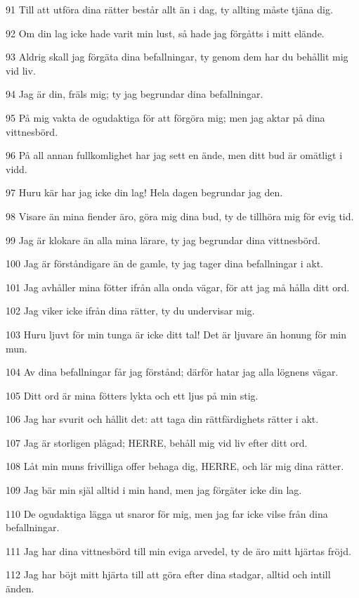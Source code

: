 \par 91 Till att utföra dina rätter består allt än i dag, ty allting måste tjäna dig.
\par 92 Om din lag icke hade varit min lust, så hade jag förgåtts i mitt elände.
\par 93 Aldrig skall jag förgäta dina befallningar, ty genom dem har du behållit mig vid liv.
\par 94 Jag är din, fräls mig; ty jag begrundar dina befallningar.
\par 95 På mig vakta de ogudaktiga för att förgöra mig; men jag aktar på dina vittnesbörd.
\par 96 På all annan fullkomlighet har jag sett en ände, men ditt bud är omätligt i vidd.
\par 97 Huru kär har jag icke din lag! Hela dagen begrundar jag den.
\par 98 Visare än mina fiender äro, göra mig dina bud, ty de tillhöra mig för evig tid.
\par 99 Jag är klokare än alla mina lärare, ty jag begrundar dina vittnesbörd.
\par 100 Jag är förståndigare än de gamle, ty jag tager dina befallningar i akt.
\par 101 Jag avhåller mina fötter ifrån alla onda vägar, för att jag må hålla ditt ord.
\par 102 Jag viker icke ifrån dina rätter, ty du undervisar mig.
\par 103 Huru ljuvt för min tunga är icke ditt tal! Det är ljuvare än honung för min mun.
\par 104 Av dina befallningar får jag förstånd; därför hatar jag alla lögnens vägar.
\par 105 Ditt ord är mina fötters lykta och ett ljus på min stig.
\par 106 Jag har svurit och hållit det: att taga din rättfärdighets rätter i akt.
\par 107 Jag är storligen plågad; HERRE, behåll mig vid liv efter ditt ord.
\par 108 Låt min muns frivilliga offer behaga dig, HERRE, och lär mig dina rätter.
\par 109 Jag bär min själ alltid i min hand, men jag förgäter icke din lag.
\par 110 De ogudaktiga lägga ut snaror för mig, men jag far icke vilse från dina befallningar.
\par 111 Jag har dina vittnesbörd till min eviga arvedel, ty de äro mitt hjärtas fröjd.
\par 112 Jag har böjt mitt hjärta till att göra efter dina stadgar, alltid och intill änden.
